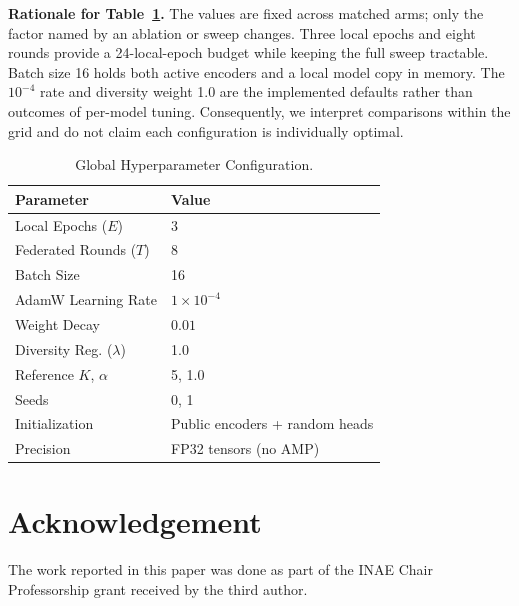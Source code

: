 \documentclass[letterpaper, conference]{IEEEtran}
\begin{document}
\textbf{Rationale for Table~\ref{tab:hyper}.}
The values are fixed across matched arms; only the factor named by an ablation or
sweep changes. Three local epochs and eight rounds provide a 24-local-epoch budget
while keeping the full sweep tractable. Batch size 16 holds both active encoders
and a local model copy in memory. The $10^{-4}$ rate and diversity weight 1.0 are
the implemented defaults rather than outcomes of per-model tuning. Consequently,
we interpret comparisons within the grid and do not claim each configuration is
individually optimal.

\begin{table}[t]
\caption{Global Hyperparameter Configuration.}
\label{tab:hyper}
\centering\footnotesize
\begin{tabular}{ll}
\toprule
\textbf{Parameter} & \textbf{Value} \\
\midrule
Local Epochs ($E$) & 3 \\
Federated Rounds ($T$) & 8 \\
Batch Size & 16 \\
AdamW Learning Rate & $1 \times 10^{-4}$ \\
Weight Decay & $0.01$ \\
Diversity Reg. ($\lambda$) & 1.0 \\
Reference $K$, $\alpha$ & 5, 1.0 \\
Seeds & 0, 1 \\
Initialization & Public encoders + random heads \\
Precision & FP32 tensors (no AMP) \\
\bottomrule
\end{tabular}
\end{table}




\FloatBarrier

\let\oldbibliography\thebibliography
\renewcommand{\thebibliography}[1]{%
  \oldbibliography{#1}%
  \scriptsize
  \setlength{\itemsep}{0pt}%
  \setlength{\parskip}{0pt}%
  \setlength{\topsep}{0pt}%
}

\section{Acknowledgement}
The work reported in this paper was done as part of the INAE Chair Professorship grant received by the third author.
\end{document}
